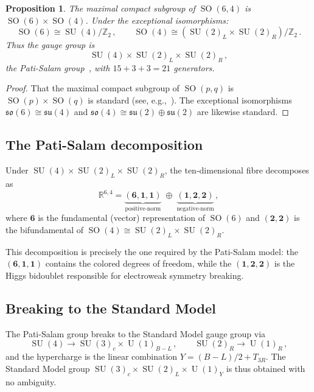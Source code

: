 \documentclass[12pt,a4paper]{article}
\newtheorem{proposition}[theorem]{Proposition}
\theoremstyle{definition}
\newcommand{\SO}{\operatorname{SO}}
\newcommand{\SU}{\operatorname{SU}}
\newcommand{\U}{\operatorname{U}}
\newcommand{\R}{\mathbb{R}}
\newcommand{\Z}{\mathbb{Z}}
\begin{document}
\begin{proposition}
\label{prop:maxcompact}
The maximal compact subgroup of $\SO(6,4)$ is $\SO(6) \times \SO(4)$.
Under the exceptional isomorphisms:
\begin{equation}
\SO(6) \cong \SU(4)/\Z_2\,, \qquad \SO(4) \cong (\SU(2)_L \times \SU(2)_R)/\Z_2\,.
\end{equation}
Thus the gauge group is
\begin{equation}
\SU(4) \times \SU(2)_L \times \SU(2)_R\,,
\end{equation}
the Pati-Salam group~\cite{PatiSalam1974}, with $15 + 3 + 3 = 21$ generators.
\end{proposition}

\begin{proof}
That the maximal compact subgroup of $\SO(p,q)$ is $\SO(p) \times \SO(q)$ is standard (see, e.g.,~\cite{Helgason1978}).
The exceptional isomorphisms $\mathfrak{so}(6) \cong \mathfrak{su}(4)$ and $\mathfrak{so}(4) \cong \mathfrak{su}(2) \oplus \mathfrak{su}(2)$ are likewise standard.
\end{proof}

\subsection{The Pati-Salam decomposition}

Under $\SU(4) \times \SU(2)_L \times \SU(2)_R$, the ten-dimensional fibre decomposes as
\begin{equation}
\label{eq:fibre_decomp}
\R^{6,4} = \underbrace{(\mathbf{6}, \mathbf{1}, \mathbf{1})}_{\text{positive-norm}} \;\oplus\; \underbrace{(\mathbf{1}, \mathbf{2}, \mathbf{2})}_{\text{negative-norm}}\,,
\end{equation}
where $\mathbf{6}$ is the fundamental (vector) representation of $\SO(6)$ and $(\mathbf{2},\mathbf{2})$ is the bifundamental of $\SO(4) \cong \SU(2)_L \times \SU(2)_R$.

This decomposition is precisely the one required by the Pati-Salam model: the $(\mathbf{6},\mathbf{1},\mathbf{1})$ contains the colored degrees of freedom, while the $(\mathbf{1},\mathbf{2},\mathbf{2})$ is the Higgs bidoublet responsible for electroweak symmetry breaking.

\subsection{Breaking to the Standard Model}

The Pati-Salam group breaks to the Standard Model gauge group via
\begin{equation}
\SU(4) \to \SU(3)_c \times \U(1)_{B-L}\,, \qquad \SU(2)_R \to \U(1)_R\,,
\end{equation}
and the hypercharge is the linear combination $Y = (B{-}L)/2 + T_{3R}$.
The Standard Model group $\SU(3)_c \times \SU(2)_L \times \U(1)_Y$ is thus obtained with no ambiguity.
\end{document}
